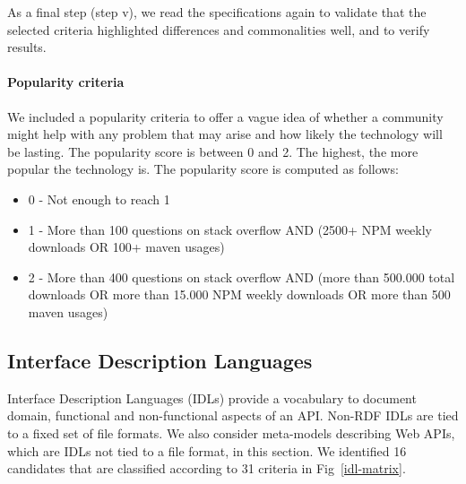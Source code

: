 As a final step (step v), we read the specifications again to validate that the selected criteria highlighted differences and commonalities well, and to verify results.

\paragraph{Popularity criteria}


We included a popularity criteria to offer a vague idea of whether a community might help with any problem that may arise and how likely the technology will be lasting. The popularity score is between 0 and 2. The highest, the more popular the technology is. The popularity score is computed as follows:

\begin{itemize}
    \item 0 - Not enough to reach 1
    \item 1 - More than 100 questions on stack overflow AND (2500+ NPM weekly downloads OR 100+ maven usages)
    \item 2 - More than 400 questions on stack overflow AND (more than 500.000 total downloads OR more than 15.000 NPM weekly downloads OR more than 500 maven usages)
\end{itemize}

\subsection{Interface Description Languages}

Interface Description Languages (IDLs) provide a vocabulary to document domain, functional and non-functional aspects of an API. Non-RDF IDLs are tied to a fixed set of file formats. We also consider meta-models describing Web APIs, which are IDLs not tied to a file format, in this section. We identified 16 candidates that are classified according to 31 criteria in Fig~\ref{idl-matrix}.

